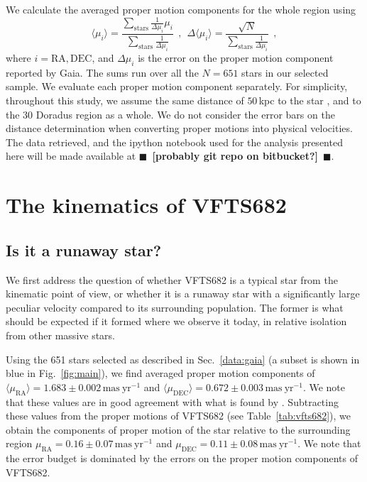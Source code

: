 \documentclass[apjl,twocolumn]{emulateapj}
\newcommand{\todo}[1]{{\large $\blacksquare$~\textbf{\color{red}[#1]}}~$\blacksquare$}
\DeclareRobustCommand{\Figref}[1]{Fig.~\ref{#1}}
\DeclareRobustCommand{\Tabref}[1]{Table~\ref{#1}}
\DeclareRobustCommand{\Secref}[1]{Sec.~\ref{#1}}
\begin{document}
We calculate the averaged proper motion components for the whole
region using 
\begin{equation}
  \label{eq:mean}
  \langle \mu_i\rangle = \frac{\sum_\mathrm{stars}\frac{1}{\Delta
      \mu_i}\mu_i}{\sum_\mathrm{stars} \frac{1}{\Delta \mu_i}} \ \ , \
  \ \Delta \langle \mu_i\rangle = \frac{\sqrt{N}}{\sum_\mathrm{stars}
    \frac{1}{\Delta \mu_i}} \ \ ,
\end{equation}
where $i = \mathrm{RA}, \mathrm{DEC}$, and $\Delta \mu_i$ is the error
on the proper motion component reported by Gaia. The sums run over
all the $N=651$ stars in our selected sample. We evaluate each proper motion
component separately. For simplicity, throughout this study, we assume the same
distance of $50$\,kpc to the star \citep[][]{pietrzynski:13}, and to
the 30 Doradus region as a whole. We do not consider the error bars on
the distance determination when converting proper motions into
physical velocities. The data retrieved, and the ipython notebook used for the analysis
presented here will be made available at \todo{probably git repo on bitbucket?}. 

\section{The kinematics of VFTS682}
\label{sec:results}

\subsection{Is it a runaway star?}
\label{sec:runaway}
We first address the question of whether VFTS682 is a typical star
from the kinematic point of view, or whether it is a runaway star with
a significantly large peculiar velocity compared to its surrounding population. The former is what should
be expected if it formed where we observe it today, in relative
isolation from other massive stars.

Using the 651 stars selected as described in \Secref{data:gaia} (a
subset is shown in blue in \Figref{fig:main}), we find averaged proper motion components of
$\langle\mu_\mathrm{RA}\rangle = 1.683\pm0.002\,\mathrm{mas\ yr^{-1}}$ and
$\langle\mu_\mathrm{DEC}\rangle =
0.672\pm0.003\,\mathrm{mas\ yr^{-1}}$. We note that these values are
in good agreement with what is found by \cite{lennon:18}. Subtracting these values from the
proper motions of VFTS682 (see \Tabref{tab:vfts682}), we obtain the
components of proper motion of the star relative to the surrounding region
$\mu_\mathrm{RA} = 0.16\pm 0.07\,\mathrm{mas\ yr^{-1}}$ and $\mu_\mathrm{DEC} =
0.11\pm 0.08\,\mathrm{mas\ yr^{-1}}$. We note that the error budget is
dominated by the errors on the proper motion components of VFTS682.
\end{document}
